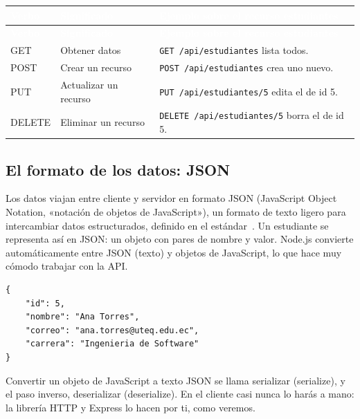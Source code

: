 \documentclass[11pt]{article}
\begin{document}
{\renewcommand{\arraystretch}{1.25}
\begin{longtable}{>{\raggedright\arraybackslash}p{2.4cm} >{\raggedright\arraybackslash}p{5.1cm} >{\raggedright\arraybackslash}p{7.3cm}}
\rowcolor{ndverde}\textcolor{white}{\textbf{Verbo}} & \textcolor{white}{\textbf{Significado}} & \textcolor{white}{\textbf{Ejemplo sobre el recurso estudiantes}} \\
\endfirsthead
\rowcolor{ndverde}\textcolor{white}{\textbf{Verbo}} & \textcolor{white}{\textbf{Significado}} & \textcolor{white}{\textbf{Ejemplo sobre el recurso estudiantes}} \\
\endhead
\ttfamily\color{ndverde}GET & Obtener datos & \texttt{GET /api/estudiantes} lista todos. \\ \hline
\ttfamily\color{ndverde}POST & Crear un recurso & \texttt{POST /api/estudiantes} crea uno nuevo. \\ \hline
\ttfamily\color{ndverde}PUT & Actualizar un recurso & \texttt{PUT /api/estudiantes/5} edita el de id 5. \\ \hline
\ttfamily\color{ndverde}DELETE & Eliminar un recurso & \texttt{DELETE /api/estudiantes/5} borra el de id 5. \\ \hline
\end{longtable}}

\subsection{El formato de los datos: JSON}
Los datos viajan entre cliente y servidor en formato JSON (JavaScript Object Notation, «notación de objetos de JavaScript»), un formato de texto ligero para intercambiar datos estructurados, definido en el estándar~\citep{rfc8259json}. Un estudiante se representa así en JSON: un objeto con pares de nombre y valor. Node.js convierte automáticamente entre JSON (texto) y objetos de JavaScript, lo que hace muy cómodo trabajar con la API.

\begin{cajacodigo}
\begin{lstlisting}[style=json]
{
	"id": 5,
	"nombre": "Ana Torres",
	"correo": "ana.torres@uteq.edu.ec",
	"carrera": "Ingenieria de Software"
}
\end{lstlisting}
\end{cajacodigo}
\vspace{2pt}
Convertir un objeto de JavaScript a texto JSON se llama serializar (serialize), y el paso inverso, deserializar (deserialize). En el cliente casi nunca lo harás a mano: la librería HTTP y Express lo hacen por ti, como veremos.
\end{document}
